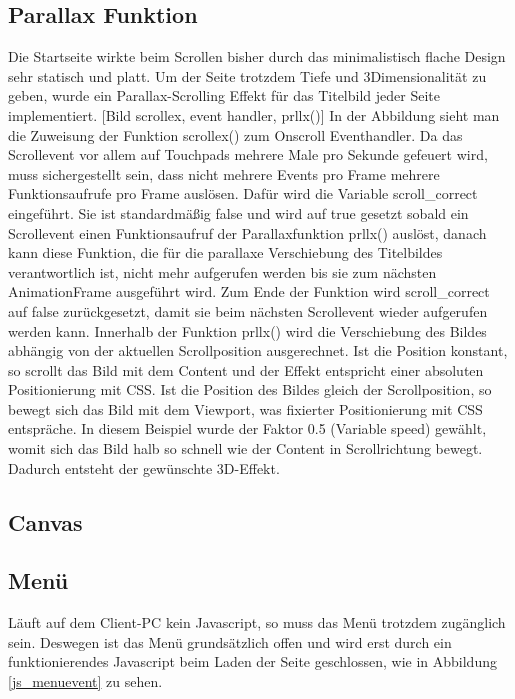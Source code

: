 \subsection{Parallax Funktion}
Die Startseite wirkte beim Scrollen bisher durch das minimalistisch flache Design sehr statisch und platt. Um der Seite trotzdem Tiefe und 3Dimensionalität zu geben, wurde ein Parallax-Scrolling Effekt für das Titelbild jeder Seite implementiert.
[Bild scrollex, event handler, prllx()]
In der Abbildung sieht man die Zuweisung der Funktion scrollex() zum Onscroll Eventhandler. Da das Scrollevent vor allem auf Touchpads mehrere Male pro Sekunde gefeuert wird, muss sichergestellt sein, dass nicht mehrere Events pro Frame mehrere Funktionsaufrufe pro Frame auslösen. Dafür wird die Variable scroll\_correct eingeführt. Sie ist standardmäßig false und wird auf true gesetzt sobald ein Scrollevent einen Funktionsaufruf der Parallaxfunktion prllx() auslöst, danach kann diese Funktion, die für die parallaxe Verschiebung des Titelbildes verantwortlich ist, nicht mehr aufgerufen werden bis sie zum nächsten AnimationFrame ausgeführt wird. Zum Ende der Funktion wird scroll\_correct auf false zurückgesetzt, damit sie beim nächsten Scrollevent wieder aufgerufen werden kann. Innerhalb der Funktion prllx() wird die Verschiebung des Bildes abhängig von der aktuellen Scrollposition ausgerechnet. Ist die Position konstant, so scrollt das Bild mit dem Content und der Effekt entspricht einer absoluten Positionierung mit CSS. Ist die Position des Bildes gleich der Scrollposition, so bewegt sich das Bild mit dem Viewport, was fixierter Positionierung mit CSS entspräche. In diesem Beispiel wurde der Faktor 0.5 (Variable speed) gewählt, womit sich das Bild halb so schnell wie der Content in Scrollrichtung bewegt. Dadurch entsteht der gewünschte 3D-Effekt.




\subsection{Canvas}




\subsection{Menü}
Läuft auf dem Client-PC kein Javascript, so muss das Menü trotzdem zugänglich sein. Deswegen ist das Menü grundsätzlich offen und wird erst durch ein funktionierendes Javascript beim Laden der Seite geschlossen, wie in Abbildung \ref{js_menuevent} zu sehen.

